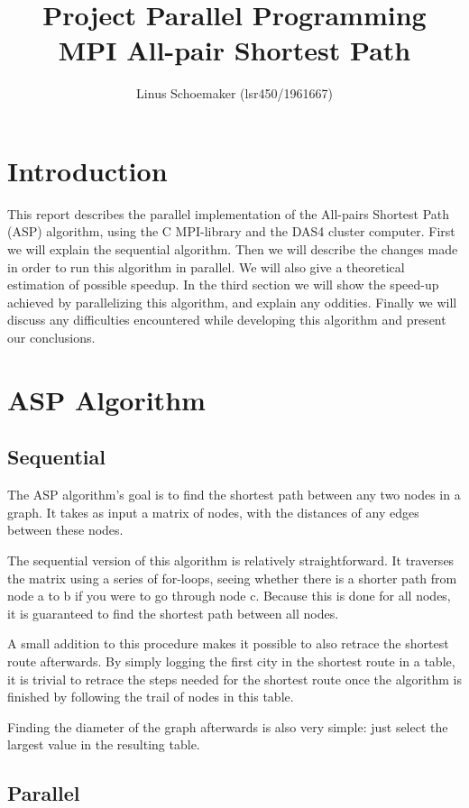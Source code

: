 \documentclass[a4paper,11pt]{article}
\title{Project Parallel Programming \\ MPI All-pair Shortest Path}
\author{ Linus Schoemaker (lsr450/1961667)}
\begin{document}
\maketitle

\section{Introduction}

This report describes the parallel implementation of the All-pairs Shortest Path (ASP) algorithm, using the C MPI-library and the DAS4 cluster computer. 
First we will explain the sequential algorithm. Then we will describe the changes made in order to run this algorithm in parallel. We will also give a theoretical estimation of possible speedup.
In the third section we will show the speed-up achieved by parallelizing this algorithm, and explain any oddities. 
Finally we will discuss any difficulties encountered while developing this algorithm and present our conclusions.

\section{ASP Algorithm}

\subsection{Sequential}
The ASP algorithm's goal is to find the shortest path between any two nodes in a graph. It takes as input a matrix of nodes, with the distances of any edges between these nodes. 

The sequential version of this algorithm is relatively straightforward. It traverses the matrix using a series of for-loops, seeing whether there is a shorter path from node a to b if you were to go through node c. Because this is done for all nodes, it is guaranteed to find the shortest path between all nodes.

A small addition to this procedure makes it possible to also retrace the shortest route afterwards. By simply logging the first city in the shortest route in a table, it is trivial to retrace the steps needed for the shortest route once the algorithm is finished by following the trail of nodes in this table. 

Finding the diameter of the graph afterwards is also very simple: just select the largest value in the resulting table.

\subsection{Parallel}
\end{document}

